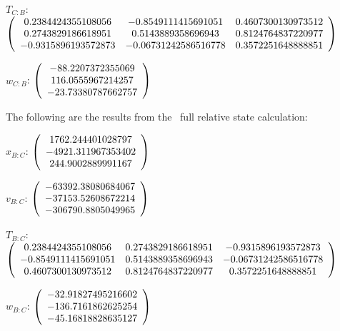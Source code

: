 \begin{description}
$T_{C:B}$: $\left( \begin{array} {ccc}
0.2384424355108056 &   -0.8549111415691051 &    0.4607300130973512 \\
 0.2743829186618951 &    0.5143889358696943 &    0.8124764837220977 \\
  -0.9315896193572873 &  -0.06731242586516778 &    0.3572251648888851 \\
\end{array} \right)\\ \\$

$w_{C:B}$:  $\left( \begin{array} {ccc}  -88.2207372355069 \\     116.0555967214257 \\    -23.73380787662757
\end{array} \right)\\ \\$

The following are the results from the \ full relative state calculation:

$x_{B:C}$: $\left( \begin{array} {ccc}  1762.244401028797 \\    -4921.311967353402 \\     244.9002889991167
\end{array} \right)\\ \\$

$v_{B:C}$:  $\left( \begin{array} {ccc}  -63392.38080684067 \\    -37153.52608672214 \\    -306790.8805049965
\end{array} \right)\\ \\$

$T_{B:C}$: $\left( \begin{array} {ccc}
 0.2384424355108056 &    0.2743829186618951 &   -0.9315896193572873  \\
 -0.8549111415691051 &    0.5143889358696943 &  -0.06731242586516778 \\
 0.4607300130973512 &    0.8124764837220977 &    0.3572251648888851 \\
\end{array} \right)\\ \\$

$w_{B:C}$:  $\left( \begin{array} {ccc}  -32.91827495216602 \\    -136.7161862625254 \\    -45.16818828635127
\end{array} \right)\\ \\$


\end{description}
